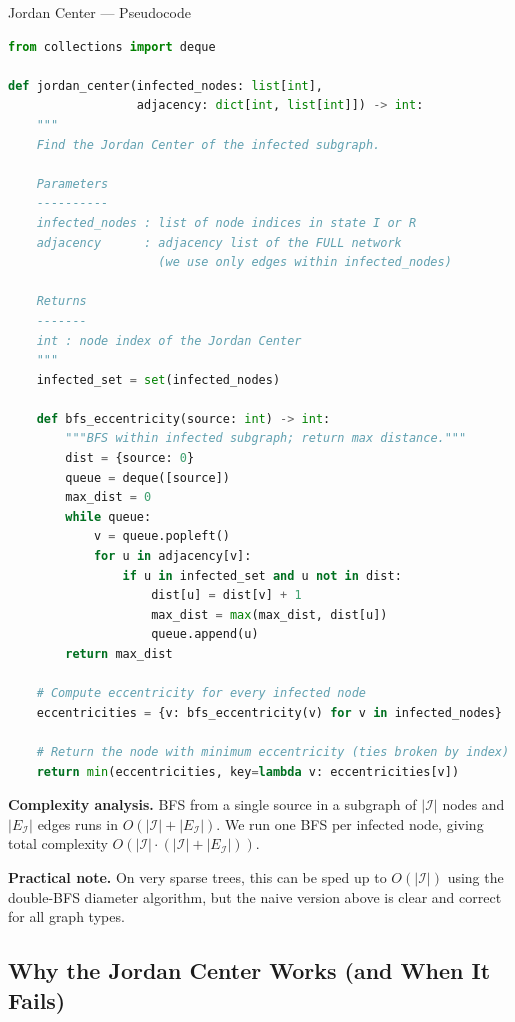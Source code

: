 \begin{codewalk}{Jordan Center --- Pseudocode}
\begin{lstlisting}[language=Python]
from collections import deque

def jordan_center(infected_nodes: list[int],
                  adjacency: dict[int, list[int]]) -> int:
    """
    Find the Jordan Center of the infected subgraph.

    Parameters
    ----------
    infected_nodes : list of node indices in state I or R
    adjacency      : adjacency list of the FULL network
                     (we use only edges within infected_nodes)

    Returns
    -------
    int : node index of the Jordan Center
    """
    infected_set = set(infected_nodes)

    def bfs_eccentricity(source: int) -> int:
        """BFS within infected subgraph; return max distance."""
        dist = {source: 0}
        queue = deque([source])
        max_dist = 0
        while queue:
            v = queue.popleft()
            for u in adjacency[v]:
                if u in infected_set and u not in dist:
                    dist[u] = dist[v] + 1
                    max_dist = max(max_dist, dist[u])
                    queue.append(u)
        return max_dist

    # Compute eccentricity for every infected node
    eccentricities = {v: bfs_eccentricity(v) for v in infected_nodes}

    # Return the node with minimum eccentricity (ties broken by index)
    return min(eccentricities, key=lambda v: eccentricities[v])
\end{lstlisting}

\textbf{Complexity analysis.}
BFS from a single source in a subgraph of $|\mathcal{I}|$ nodes and $|E_\mathcal{I}|$
edges runs in $O(|\mathcal{I}| + |E_\mathcal{I}|)$. We run one BFS per infected node,
giving total complexity $O(|\mathcal{I}| \cdot (|\mathcal{I}| + |E_\mathcal{I}|))$.

\textbf{Practical note.} On very sparse trees, this can be sped up to $O(|\mathcal{I}|)$
using the double-BFS diameter algorithm, but the naive version above is clear and
correct for all graph types.
\end{codewalk}

\subsection{Why the Jordan Center Works (and When It Fails)}

